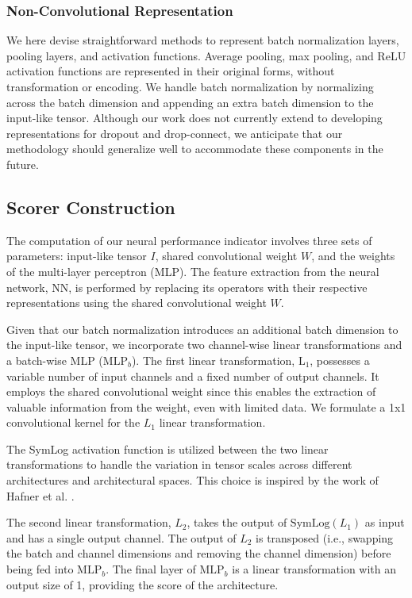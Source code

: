 \documentclass[lettersize,journal]{IEEEtran}
\begin{document}
        \subsubsection{Non-Convolutional Representation}
            We here devise straightforward methods to represent batch normalization layers, pooling layers, and activation functions. Average pooling, max pooling, and ReLU activation functions are represented in their original forms, without transformation or encoding. We handle batch normalization by normalizing across the batch dimension and appending an extra batch dimension to the input-like tensor. Although our work does not currently extend to developing representations for dropout and drop-connect, we anticipate that our methodology should generalize well to accommodate these components in the future.

    \subsection{Scorer Construction} \label{sec:scorer}

        The computation of our neural performance indicator involves three sets of parameters: input-like tensor $I$, shared convolutional weight $W$, and the weights of the multi-layer perceptron (MLP). The feature extraction from the neural network, $\mathrm{NN}$, is performed by replacing its operators with their respective representations using the shared convolutional weight $W$.
        
        Given that our batch normalization introduces an additional batch dimension to the input-like tensor, we incorporate two channel-wise linear transformations and a batch-wise MLP ($\mathrm{MLP}_b$). The first linear transformation, $\mathrm L_1$, possesses a variable number of input channels and a fixed number of output channels. It employs the shared convolutional weight since this enables the extraction of valuable information from the weight, even with limited data. We formulate a 1x1 convolutional kernel for the $L_1$ linear transformation.
        
        The SymLog activation function is utilized between the two linear transformations to handle the variation in tensor scales across different architectures and architectural spaces. This choice is inspired by the work of  Hafner et al. \cite{hafner2023dreamerv3}.
        
        The second linear transformation, $L_2$, takes the output of $\mathrm{SymLog}(L_1)$ as input and has a single output channel. The output of $L_2$ is transposed (i.e., swapping the batch and channel dimensions and removing the channel dimension) before being fed into $\mathrm{MLP}_b$. The final layer of $\mathrm{MLP}_b$ is a linear transformation with an output size of 1, providing the score of the architecture.
        
\end{document}
